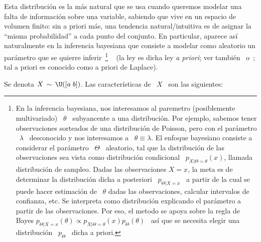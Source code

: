 \label{Sssec:MP:UniformeContinua}

Esta distribuci\'on es  la m\'as natural que se usa  cuando queremos modelar una
falta de  informaci\'on sobre una variable,  sabiendo que vive en  un espacio de
volumen  finito: sin  a  priori  m\'as, una  tendencia  natural/intuitiva es  de
asignar la  ``misma probabilidad''  a cada punto  del conjunto.   En particular,
aparece as\'i  naturalmente en  la inferencia bayesiana  que consiste  a modelar
como aleatorio un par\'ametro  que se quierre inferir~\footnote{En la inferencia
  bayesiana, nos interesamos al paremetro (posiblemente multivariado) \ $\theta$
  \ subyancente  a una distribuci\'on. Por ejemplo,  sabemos tener observaciones
  sorteados  de  una  distribuci\'on  de  Poisson, pero  con  el  par\'ametro  \
  $\lambda$ \  desconocido y  nos interesamos a  \ $\theta \equiv  \lambda$.  El
  enfoque bayesiano consiste a considerar el par\'ametro \ $\Theta$ \ aleatorio,
  tal que la  distribuci\'on de las observaciones sea  vista como distribuci\'on
  condicional \  $p_{X|\Theta = \theta}(x)$, llamada  distribuci\'on de sampleo.
  Dadas las  observaciones $X = x$,  la meta es de  determinar la distribuci\'on
  dicha a posteriori \  $p_{\Theta|X = x}$ \ a partir de  la cual se puede hacer
  estimaci\'on  de \ $\theta$  dadas las  observaciones, calcular  intervalos de
  confianza, etc. Se interpreta  como distribuci\'on explicando el par\'ametro a
  partir de  las observaciones.  Por eso, el  metodo se apoya sobre  la regla de
  Bayes $p_{\Theta|X=x}(\theta) \propto p_{X|\Theta=\theta}(x) p_\Theta(\theta)$
  \  as\'i que  se necesita  elegir una  distribuci\'on \  $p_\Theta$ \  dicha a
  priori.\label{Foot:MP:BayesPrior} }
~\cite{Rob07} (la
ley  es dicha  ley  {\em a  priori};  ver tambi\'en~\cite{Bay63}  o~\cite{Lap12,
  Lap14, Lap20}; tal a priori es conocido como a priori de Laplace).

Se denota $X \, \sim \, \U([a \; b])$. Las caracter\'isticas de \ $X$ \ son las
siguientes:

